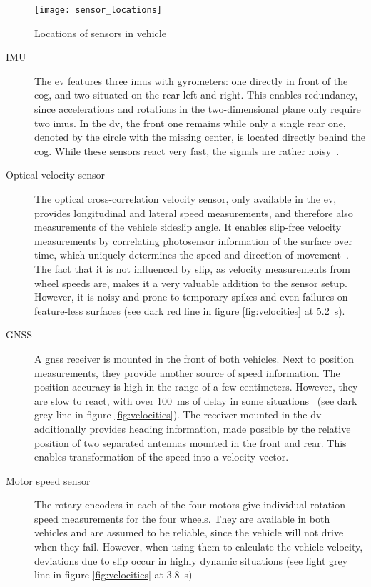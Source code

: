 \begin{figure}[h]
	\centering
	\texttt{[image: sensor\_locations]}%
	\caption{Locations of sensors in vehicle}
	\label{fig:sensor-locations}
\end{figure}

\begin{description}
\item[IMU] The \gls{ev} features three \glspl{imu} with gyrometers: one directly in front of the \gls{cog}, and two situated on the rear left and right. This enables redundancy, since accelerations and rotations in the two-dimensional plane only require two \glspl{imu}. In the \gls{dv}, the front one remains while only a single rear one, denoted by the circle with the missing center, is located directly behind the \gls{cog}. While these sensors react very fast, the signals are rather noisy~\cite[p.~19~ff.]{Biel.2019}.

\item[Optical velocity sensor] The optical cross-correlation velocity sensor, only available in the \gls{ev}, provides longitudinal and lateral speed measurements, and therefore also measurements of the vehicle sideslip angle. It enables slip-free velocity measurements by correlating photosensor information of the surface over time, which uniquely determines the speed and direction of movement~\cite{Bellof.4241993}. The fact that it is not influenced by slip, as velocity measurements from wheel speeds are, makes it a very valuable addition to the sensor setup. However, it is noisy and prone to temporary spikes and even failures on feature-less surfaces (see dark red line in figure \ref{fig:velocities} at \SI{5.2}{\second}).

\item[GNSS] A \gls{gnss} receiver is mounted in the front of both vehicles. Next to position measurements, they provide another source of speed information. The position accuracy is high in the range of a few centimeters. However, they are slow to react, with over \SI{100}{\milli\second} of delay in some situations~\cite[p.~27]{Biel.2019} (see dark grey line in figure \ref{fig:velocities}). The receiver mounted in the \gls{dv} additionally provides heading information, made possible by the relative position of two separated antennas mounted in the front and rear. This enables transformation of the speed into a velocity vector.

\item[Motor speed sensor] The rotary encoders in each of the four motors give individual rotation speed measurements for the four wheels. They are available in both vehicles and are assumed to be reliable, since the vehicle will not drive when they fail. However, when using them to calculate the vehicle velocity, deviations due to slip occur in highly dynamic situations (see light grey line in figure \ref{fig:velocities} at \SI{3.8}{\second})
\end{description}

